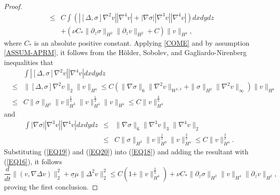 \documentclass[10pt,a4paper]{amsart}
\begin{document}
\begin{proof}
\begin{eqnarray}
  &\leq& C\int(|[\Delta,\sigma]\nabla^2v||\nabla^4v|+|\nabla\sigma||\nabla^3v||\nabla^4v|)dxdydz\nonumber\\
  &&+ (\nu C_*\|\partial_z\sigma\|_{H^2}\|\partial_zv\|_{H^2}+C)\|v\|_{H^4},\label{EQ18}
\end{eqnarray}
where $C_*$ is an absolute positive constant.
Applying \eqref{COME} and by assumption \eqref{ASSUM-APRM}, it follows from the H\"older, Sobolev, and Gagliardo-Nirenberg inequalities that
\begin{eqnarray}
  &&\int|[\Delta,\sigma]\nabla^2v||\nabla^4v|dxdydz\nonumber\\
  &\leq& \|[\Delta,\sigma]\nabla^2v\|_2\|v\|_{H^4} \leq C\left(\|\nabla\sigma\|_6\|\nabla^2v\|_{W^{1,3}}+\|\sigma\|_{H^2}\|\nabla^2v\|_\infty\right)\|v\|_{H^4}\nonumber\\
  &\leq& C\|\sigma\|_{H^2}\|v\|_{H^3}^\frac12\|v\|_{H^4}^\frac12\|v\|_{H^4}\leq C\|v\|_{H^4}^\frac32 \label{EQ19}
\end{eqnarray}
and
\begin{eqnarray}
  \int|\nabla\sigma||\nabla^3v||\nabla^4v|dxdydz
  &\leq&\|\nabla\sigma\|_6\|\nabla^3v\|_3\|\nabla^4v\|_2\nonumber\\
  &\leq& C\|\sigma\|_{H^2}\|v\|_{H^3}^\frac12\|v\|_{H^4}^\frac32 \leq C\|v\|_{H^4}^\frac32. \label{EQ20}
\end{eqnarray}
Substituting (\ref{EQ19}) and (\ref{EQ20}) into (\ref{EQ18}) and adding the resultant with (\ref{EQ16}), it follows
\begin{equation}
  \frac{d}{dt}\|(v,\nabla\Delta v)\|_2^2+\underline\sigma \mu\|\Delta^2v\|_2^2
  \leq C(1+\|v\|_{H^4}^\frac32)+\nu C_*\|\partial_z\sigma\|_{H^2}\|v\|_{H^4}\|\partial_zv\|_{H^2},\label{EQ34}
\end{equation}
proving the first conclusion.



\end{proof}
\end{document}
